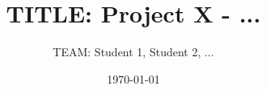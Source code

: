 \documentclass[a4paper]{DPSbachelor}
\title{TITLE: Project X - ...}
\author{TEAM: Student 1, Student 2, ...}
\date{\today}
\begin{document}
	\maketitle

	\abstract{}

	\tableofcontents

	
	
	
	
	

%	
% 	


	
\end{document}
